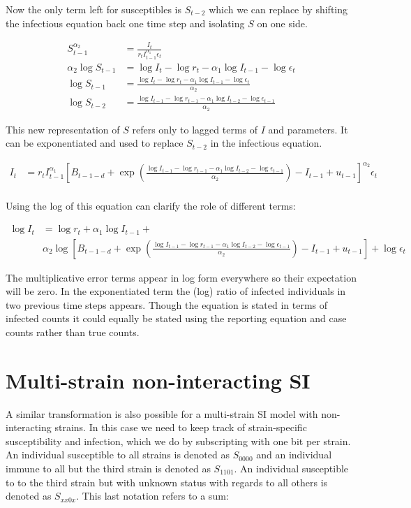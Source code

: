 Now the only term left for susceptibles is $S_{t-2}$ which we can
replace by shifting the infectious equation back one time step and
isolating $S$ on one side.

\begin{align}
S_{t-1}^{\alpha_2} &= \frac{I_t}{r_t I_{t-1}^{\alpha_1} \epsilon_{t}} \\
\alpha_2 \log S_{t-1} &= \log I_t - \log r_t - \alpha_1 \log I_{t-1} - \log \epsilon_{t}  \\
\log S_{t-1} &= \frac{\log I_t - \log r_t - \alpha_1 \log I_{t-1} - \log \epsilon_{t}}{\alpha_2}  \\
\log S_{t-2} &= \frac{\log I_{t-1} - \log r_{t-1} - \alpha_1 \log I_{t-2} - \log \epsilon_{t-1}}{\alpha_2}
\end{align}

This new representation of $S$ refers only to lagged terms of $I$ and
parameters.  It can be exponentiated and used to replace $S_{t-2}$ in the infectious
equation.  

\begin{align}
I_t &= r_t I_{t-1}^{\alpha_1} 
	\left[
		B_{t-1-d} + \exp\left(
			\frac{\log I_{t-1} - \log r_{t-1} - \alpha_1 \log I_{t-2} - \log \epsilon_{t-1}}{\alpha_2}
		\right) - I_{t-1} + u_{t-1}
	\right]^{\alpha_2} \epsilon_{t} \\
\end{align}

Using the log of this equation can clarify the role of different terms:

\begin{align}
\log I_t &= \log r_t + \alpha_1 \log I_{t-1} + \\
				 &	\alpha_2 \log \left[
		B_{t-1-d} + \exp\left(
			\frac{\log I_{t-1} - \log r_{t-1} - \alpha_1 \log I_{t-2} - \log \epsilon_{t-1}}{\alpha_2}
		\right) - I_{t-1} + u_{t-1}
	\right] + \log \epsilon_{t}
\end{align}

The multiplicative error terms appear in log form everywhere so their
expectation will be zero.  In the exponentiated term the (log) ratio of
infected individuals in two previous time steps appears.  Though the
equation is stated in terms of infected counts it could equally be
stated using the reporting equation and case counts rather than true
counts. 

\section{Multi-strain non-interacting SI}
A similar transformation is also possible for a multi-strain SI model
with non-interacting strains.  In this case we need to keep track of
strain-specific susceptibility and infection, which we do by
subscripting with one bit per strain.  An individual susceptible to all
strains is denoted as $S_{0000}$ and an individual immune to all but
the third strain is denoted as $S_{1101}$.  An individual susceptible to
to the third strain but with unknown status with regards to all others
is denoted as $S_{xx0x}$.  This last notation refers to a sum:

